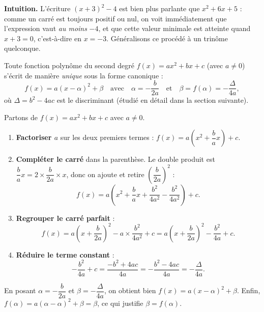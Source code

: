 \documentclass[11pt]{article}
\newcommand{\cle}[1]{{\popxbold\color{popdark}#1}}
\newcounter{popsec}
\newcounter{popsub}
\newcommand{\courssub}[1]{%
  \stepcounter{popsub}%
  \par\vspace{9pt}\noindent{\popxbold\fontsize{11.5}{13}\selectfont\color{popink}{\color{poporange}\thepopsec.\thepopsub}\hspace{6pt}#1}\par\nopagebreak\vspace{4pt}
}
\begin{document}
\courssub{La forme canonique}

\textbf{Intuition.} L'écriture $(x+3)^2 - 4$ est bien plus parlante que $x^2+6x+5$ : comme un carré est toujours positif ou nul, on voit immédiatement que l'expression vaut \emph{au moins} $-4$, et que cette valeur minimale est atteinte quand $x+3=0$, c'est-à-dire en $x=-3$. Généralisons ce procédé à un trinôme quelconque.

\begin{propriete}
Toute fonction polynôme du second degré $f(x) = ax^2 + bx + c$ (avec $a \neq 0$) s'écrit de manière \emph{unique} sous la \cle{forme canonique} :
\[ f(x) = a(x - \alpha)^2 + \beta \quad \text{avec} \quad \alpha = -\frac{b}{2a} \quad \text{et} \quad \beta = f(\alpha) = -\frac{\Delta}{4a}, \]
où $\Delta = b^2 - 4ac$ est le discriminant (étudié en détail dans la section suivante).
\end{propriete}

\begin{experience}
Partons de $f(x) = ax^2 + bx + c$ avec $a \neq 0$.
\begin{enumerate}
\item \textbf{Factoriser $a$} sur les deux premiers termes : $f(x) = a\left(x^2 + \dfrac{b}{a}x\right) + c$.
\item \textbf{Compléter le carré} dans la parenthèse. Le double produit est $\dfrac{b}{a}x = 2 \times \dfrac{b}{2a} \times x$, donc on ajoute et retire $\left(\dfrac{b}{2a}\right)^2$ :
\[ f(x) = a\left(x^2 + \frac{b}{a}x + \frac{b^2}{4a^2} - \frac{b^2}{4a^2}\right) + c. \]
\item \textbf{Regrouper le carré parfait} :
\[ f(x) = a\left(x + \frac{b}{2a}\right)^2 - a \times \frac{b^2}{4a^2} + c = a\left(x + \frac{b}{2a}\right)^2 - \frac{b^2}{4a} + c. \]
\item \textbf{Réduire le terme constant} :
\[ -\frac{b^2}{4a} + c = \frac{-b^2 + 4ac}{4a} = -\frac{b^2 - 4ac}{4a} = -\frac{\Delta}{4a}. \]
\end{enumerate}
En posant $\alpha = -\dfrac{b}{2a}$ et $\beta = -\dfrac{\Delta}{4a}$, on obtient bien $f(x) = a(x-\alpha)^2 + \beta$. Enfin, $f(\alpha) = a(\alpha - \alpha)^2 + \beta = \beta$, ce qui justifie $\beta = f(\alpha)$.
\end{experience}
\end{document}
